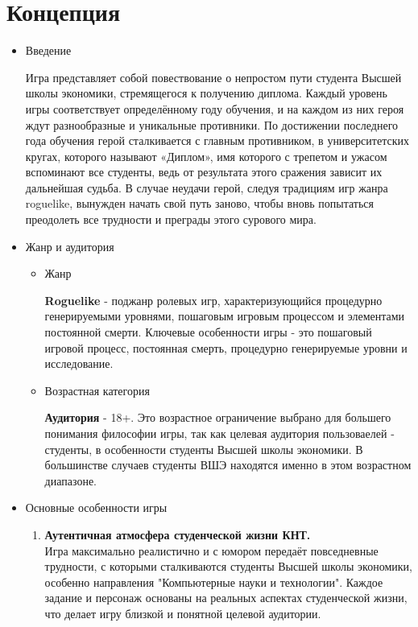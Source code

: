 \documentclass{article}
\begin{document}
\section{Концепция}
\begin{itemize}
    \item Введение \par
      Игра представляет собой повествование о непростом пути студента Высшей школы экономики, стремящегося к получению диплома. Каждый уровень игры соответствует определённому году обучения, и на каждом из них героя ждут разнообразные и уникальные противники. По достижении последнего года обучения герой сталкивается с главным противником, в университетских кругах, которого называют «Диплом», имя которого с трепетом и ужасом вспоминают все студенты, ведь от результата этого сражения зависит их дальнейшая судьба. В случае неудачи герой, следуя традициям игр жанра roguelike, вынужден начать свой путь заново, чтобы вновь попытаться преодолеть все трудности и преграды этого сурового мира.
    \item Жанр и аудитория
    \begin{itemize}
        \item Жанр \par
        \textbf{Roguelike} - поджанр ролевых игр, характеризующийся процедурно генерируемыми уровнями, пошаговым игровым процессом и элементами постоянной смерти. Ключевые особенности игры - это пошаговый игровой процесс, постоянная смерть, процедурно генерируемые уровни и исследование. 
        \item Возрастная категория \par
        \textbf{Аудитория} - 18+. Это возрастное ограничение выбрано для большего понимания философии игры, так как целевая аудитория пользоваелей - студенты, в особенности студенты Высшей школы экономики. В большинстве случаев студенты ВШЭ находятся именно в этом возрастном диапазоне.
    \end{itemize}
    \item Основные особенности игры
    \begin{enumerate}
    \item \textbf{Аутентичная атмосфера студенческой жизни КНТ.} \\
    Игра максимально реалистично и с юмором передаёт повседневные трудности, с которыми сталкиваются студенты Высшей школы экономики, особенно направления "Компьютерные науки и технологии". Каждое задание и персонаж основаны на реальных аспектах студенческой жизни, что делает игру близкой и понятной целевой аудитории.


\end{enumerate}
\end{itemize}
\end{document}
